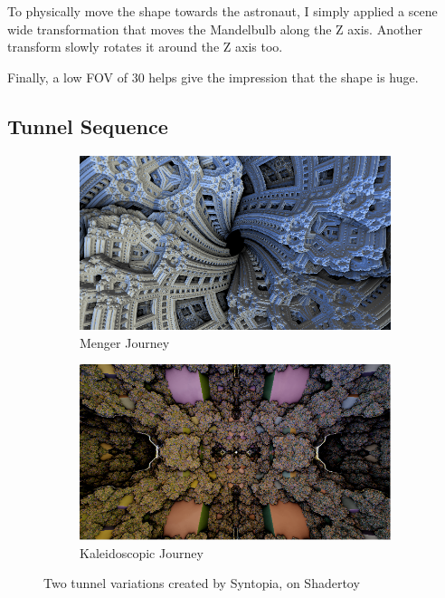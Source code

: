 \documentclass[11pt,a4paper,final,notitlepage]{report}
\begin{document}
To physically move the shape towards the astronaut, I simply applied a scene wide transformation that moves the Mandelbulb along the Z axis. Another transform slowly rotates it around the Z axis too.

Finally, a low FOV of 30 helps give the impression that the shape is huge.

\subsection{Tunnel Sequence}

\begin{figure}
\centering
\begin{subfigure}{.5\textwidth}
  \centering
  \includegraphics[width=.95\linewidth]{images/mengerjourney.png}
  \caption{Menger Journey \cite{mengerjourney}}
  \label{fig:menger}
\end{subfigure}%
\begin{subfigure}{.5\textwidth}
  \centering
  \includegraphics[width=.95\linewidth]{images/kaljourney.png}
  \caption{Kaleidoscopic Journey \cite{kaljourney}}
  \label{fig:kal}
\end{subfigure}
\caption{Two tunnel variations created by Syntopia, on Shadertoy}
\label{fig:test}
\end{figure}
\end{document}
